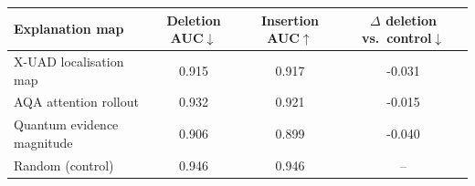 \begin{tabular}{lccc}
\toprule
Explanation map & Deletion AUC$\downarrow$ & Insertion AUC$\uparrow$ & $\Delta$ deletion vs.\ control$\downarrow$ \\
\midrule
X-UAD localisation map & 0.915 & 0.917 & -0.031 \\
AQA attention rollout & 0.932 & 0.921 & -0.015 \\
Quantum evidence magnitude & 0.906 & 0.899 & -0.040 \\
Random (control) & 0.946 & 0.946 & -- \\
\bottomrule
\end{tabular}
